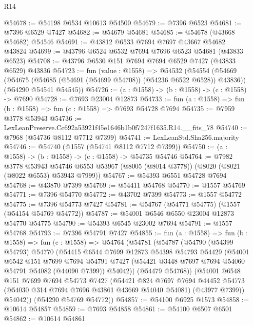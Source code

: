 \begin{lexlean}{R14}
\begin{coremodule}
@54678 := @54198 @6534 @10613 @54500
@54679 := @7396 @6523
@54681 := @7396 @6529 @7427
@54682 := @54679 @54681
@54685 := @54678 (@43668 @54682) @54546
@54691 := @43812 @6533 @7694 @7697 @43667 @54682 @43824
@54699 := @43796 @6524 @6532 @7694 @7696 @6523 @54681 (@43833 @6523)
@54708 := @43796 @6530 @151 @7694 @7694 @6529 @7427 (@43833 @6529) @43836
@54723 := fun (value : @1558) =>
  @54532
    (@54554
      (@54669 (@54675 (@54685 (@54691 (@54699 @54708)) (@54236 @6522 @6528)) @43836))
      (@54290 @54541 @54545))
@54726 := (a : @1558) -> (b : @1558) -> (c : @1558) -> @7690
@54728 := @7693 @23004 @12873
@54733 := fun (a : @1558) => fun (b : @1558) => fun (c : @1558) => @7693 @54728 @7694
@54735 := @7959 @3778 @53943
@54736 := LexLeanPreserve.Cc692a53921f45e1646b1b0f7247f1635.R14.__fits_78
@54740 := @7968 (@54736 @8112 @7712 @7399)
@54741 := LexLeanStd.Sha256.majority
@54746 := @54740 (@1557 (@54741 @8112 @7712 @7399))
@54750 := (a : @1558) -> (b : @1558) -> (c : @1558) -> @54735 @54746
@54764 := @7982
    @3778
    @53943
    @54746
    @6553
    @53967
    (@8005 (@8014 @3778))
    (@8020 (@8021 (@8022 @6553) @53943 @7999))
@54767 := @54393 @6551 @54728 @7694
@54768 := @43870 @7399
@54769 := @54411 @54768
@54770 := @1557 @54769
@54771 := @7396 @54770
@54772 := @43702 @7399
@54773 := @1557 @54772
@54775 := @7396 @54773 @7427
@54781 := @54767 (@54771 @54775) (@1557 (@54154 @54769 @54772))
@54787 := @54001 @6546 @6550 @23004 @12873 @54770 @54775
@54790 := @54393 @6545 @23002 @7694
@54791 := @1557 @54768
@54793 := @7396 @54791 @7427
@54855 := fun (a : @1558) =>
  fun (b : @1558) =>
  fun (c : @1558) =>
  @54764
    (@54781
      (@54787
        (@54790
          (@54399 @54793)
          @54770
          (@54415
            @6544
            @7699
            @12873
            @54398
            @54793
            @54429
            (@54001
              @6542
              @151
              @7699
              @7694
              @54791
              @7427
              (@54421 @3448 @7697 @7694 @54060 @54791 @54082 (@44090 @7399))
              @54042))
          (@54479 @54768))
        (@54001
          @6548
          @151
          @7699
          @7694
          @54773
          @7427
          (@54421
            @824
            @7697
            @7694
            @44452
            @54773
            (@54030 @314 @7694 @7696 @43861 @43669 @54040 @54081)
            (@43977 @7399))
          @54042))
      (@54290 @54769 @54772))
@54857 := @54100 @6925 @1573
@54858 := @10614 @54857
@54859 := @7693 @54858
@54861 := @54100 @6507 @6501
@54862 := @10614 @54861

\end{coremodule}
\end{lexlean}
